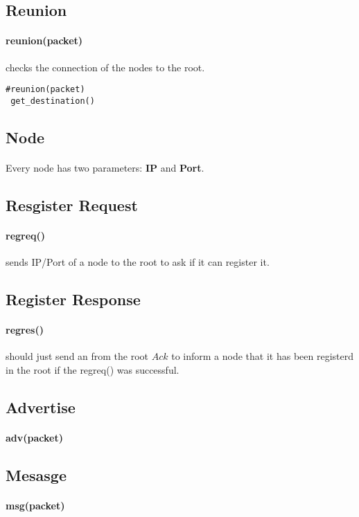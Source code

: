 \documentclass{article}
\begin{document}
\subsection{Reunion}
\paragraph{reunion(packet)} checks the connection of the nodes to the root.
\begin{lstlisting}
#reunion(packet)
 get_destination()
\end{lstlisting}
\subsection{Node}
\paragraph{}Every node has two parameters: \textbf{IP} and \textbf{Port}.
\subsection{Resgister Request}
\paragraph{reg\underline{\hspace{.05in}}req()} sends IP/Port of a node to the root to ask if it can register it. 
\subsection{Register Response}
\paragraph{reg\underline{\hspace{.05in}}res()} should just send an from the root $Ack$ to inform a node that it has been registerd in the root if the reg\underline{\hspace{.05in}}req() was successful.
\subsection{Advertise}
\paragraph{adv(packet)}
\subsection{Mesasge}
\paragraph{msg(packet)}
\clearpage
\end{document}
